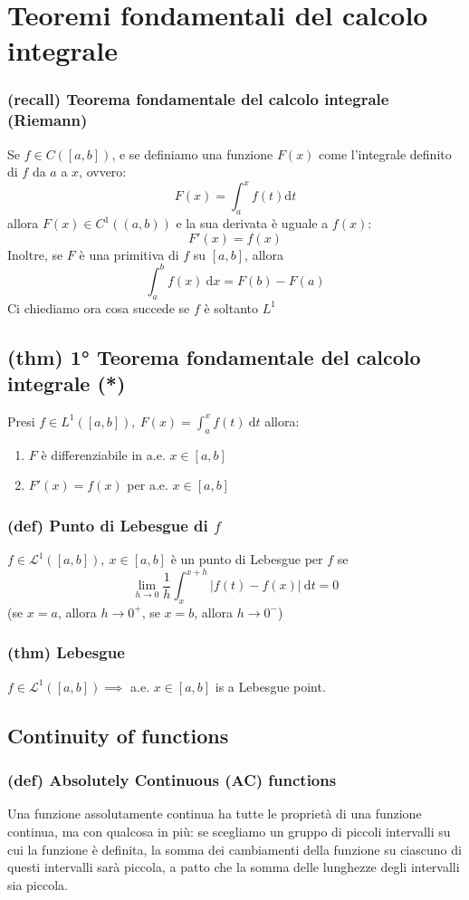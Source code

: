 \section{Teoremi fondamentali del calcolo integrale}
\subsubsection{(recall) Teorema fondamentale del calcolo integrale (Riemann)}
Se $f\in C([a,b])$, e se definiamo una funzione $F(x)$ come l'integrale definito di $f$ da $a$ a $x$, ovvero:
$$F(x)=\int_a^x f(t)\mathrm dt$$
allora $F(x)\in C^1((a,b))$ e la sua derivata è uguale a $f(x)$:
$$F'(x)=f(x)$$
Inoltre, se $F$ è una primitiva di $f$ su $[a,b]$, allora
$$\int_a^b f(x)\ \mathrm dx=F(b)-F(a)$$\label{(FFC)}
Ci chiediamo ora cosa succede se $f$ è soltanto $L^1$
\subsection{(thm) 1° Teorema fondamentale del calcolo integrale (*)}
Presi $f\in L^1([a,b]),\ F(x)=\int_a^xf(t)\ \mathrm dt$ allora:
\begin{enumerate}
    \item $F$ è differenziabile in a.e. $x\in [a,b]$
    \item $F'(x)=f(x)$ per a.e. $x\in [a,b]$
\end{enumerate}
\subsubsection{(def) Punto di Lebesgue di $f$}
$f\in \mathcal L^1([a,b]),\ x \in [a,b]$ è un punto di Lebesgue per $f$ se
$$\lim_{h\to 0}\frac 1h \int_x^{x+h}|f(t)-f(x)|\ \mathrm dt=0$$
(se $x=a$, allora $h\to 0^+$, se $x=b$, allora $h\to 0^-$)
\subsubsection{(thm) Lebesgue}
$f\in \mathcal L^1([a,b])\implies $ a.e. $x\in [a,b]$ is a Lebesgue point.
\subsection{Continuity of functions}
\subsubsection{(def) Absolutely Continuous (AC) functions}
Una funzione assolutamente continua ha tutte le proprietà di una funzione continua, ma con qualcosa in più: se scegliamo un gruppo di piccoli intervalli su cui la funzione è definita, la somma dei cambiamenti della funzione su ciascuno di questi intervalli sarà piccola, a patto che la somma delle lunghezze degli intervalli sia piccola.

